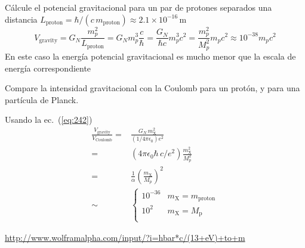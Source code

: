 \begin{example}
  C\'alcule el potencial gravitacional para un par de protones separados una distancia  $L_{\text{proton}}=\hbar/(c\, m_{\text{proton}})\approx2.1\times10^{-16}\,\text{m}$
\begin{equation}
    V_{\text{gravity}}=G_N\frac{m_p^2}{L_{\text{proton}}}=G_N m_p^3\frac{c}{\hbar}=\frac{G_N}{\hbar c}m_p^3c^2=\frac{m_p^2}{M_p^2}m_pc^2\approx10^{-38}m_pc^2
\end{equation}
En este caso la energía potencial gravitacional es mucho menor que la escala de energía correspondiente
\end{example}
\begin{example}
Compare la intensidad gravitacional con la Coulomb para un prot\'on, y para una partícula de Planck.

Usando la ec.~(\ref{eq:242})
\begin{align}
\frac{V_{\text{gravity}}}{V_{\text{Coulomb}}}=&\frac{G_N\,m_{\text{X}}^2}{(1/4\pi\epsilon_0)e^2}\nonumber\\
=&(4\pi\epsilon_0\hbar\,c/e^2)\frac{m_{\text{X}}^2}{M_p^2}\nonumber\\
=&\frac{1}{\alpha}\left(\frac{m_{\text{X}}}{M_p}\right)^2\nonumber\\
\sim&
\begin{cases}
  10^{-36}&m_{\text{X}}=m_{\text{proton}}\\
  10^{2}&m_{\text{X}}=M_{\text{p}}\\
\end{cases}
\end{align}
\end{example}

\url{http://www.wolframalpha.com/input/?i=hbar*c/(13+eV)+to+m}


